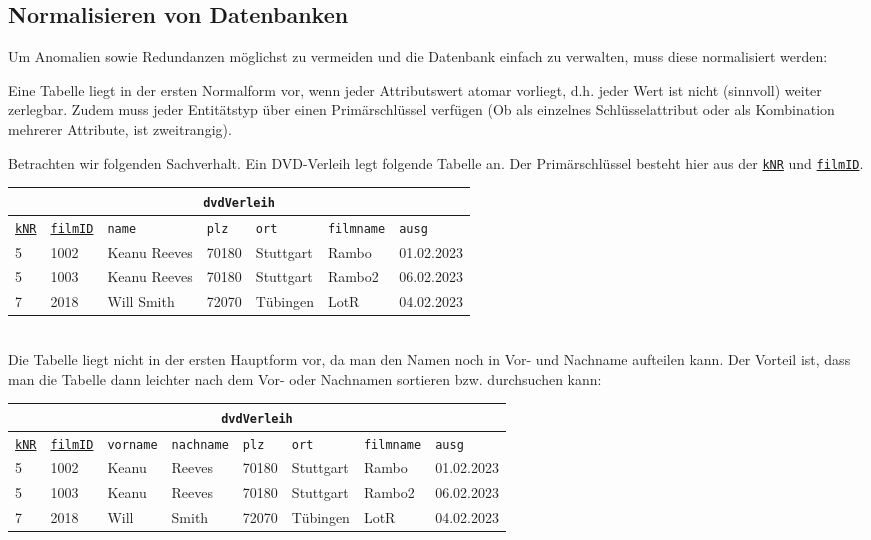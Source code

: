 \subsection[Normalisieren]{Normalisieren von Datenbanken}
Um Anomalien sowie Redundanzen möglichst zu vermeiden und die Datenbank einfach zu verwalten, muss diese normalisiert werden:
\begin{tcolorbox}[title=Erste Normalform]
	Eine Tabelle liegt in der ersten Normalform vor, wenn jeder Attributswert atomar vorliegt, d.h. jeder Wert ist nicht (sinnvoll) weiter zerlegbar. Zudem muss jeder Entitätstyp über einen Primärschlüssel verfügen (Ob als einzelnes Schlüsselattribut oder als Kombination mehrerer Attribute, ist zweitrangig).
\end{tcolorbox}
Betrachten wir folgenden Sachverhalt. Ein DVD-Verleih legt folgende Tabelle an. Der Primärschlüssel besteht hier aus der \underline{\lstinline!kNR!} und \underline{\lstinline!filmID!}.
\begin{tabular}{lllllll}
	\multicolumn{7}{c}{\lstinline!dvdVerleih!}\\
	\hline
	\underline{\lstinline!kNR!}&\underline{\lstinline!filmID!}&\lstinline!name!&\lstinline!plz!&\lstinline!ort!&\lstinline!filmname!&\lstinline!ausg!\\
	\hline
	5&1002&Keanu Reeves&70180&Stuttgart&Rambo&01.02.2023\\
	5&1003&Keanu Reeves&70180&Stuttgart&Rambo2&06.02.2023\\
	7&2018&Will Smith&72070&Tübingen&LotR&04.02.2023\\
\end{tabular}\\
Die Tabelle liegt nicht in der ersten Hauptform vor, da man den Namen noch in Vor- und Nachname aufteilen kann. Der Vorteil ist, dass man die Tabelle dann leichter nach dem Vor- oder Nachnamen sortieren bzw. durchsuchen kann:
\begin{tabular}{llllllll}
	\multicolumn{8}{c}{\lstinline!dvdVerleih!}\\
	\hline
	\underline{\lstinline!kNR!}&\underline{\lstinline!filmID!}&\lstinline!vorname!&\lstinline!nachname!&\lstinline!plz!&\lstinline!ort!&\lstinline!filmname!&\lstinline!ausg!\\
	\hline
	5&1002&Keanu&Reeves&70180&Stuttgart&Rambo&01.02.2023\\
	5&1003&Keanu&Reeves&70180&Stuttgart&Rambo2&06.02.2023\\
	7&2018&Will&Smith&72070&Tübingen&LotR&04.02.2023\\
\end{tabular}\\
